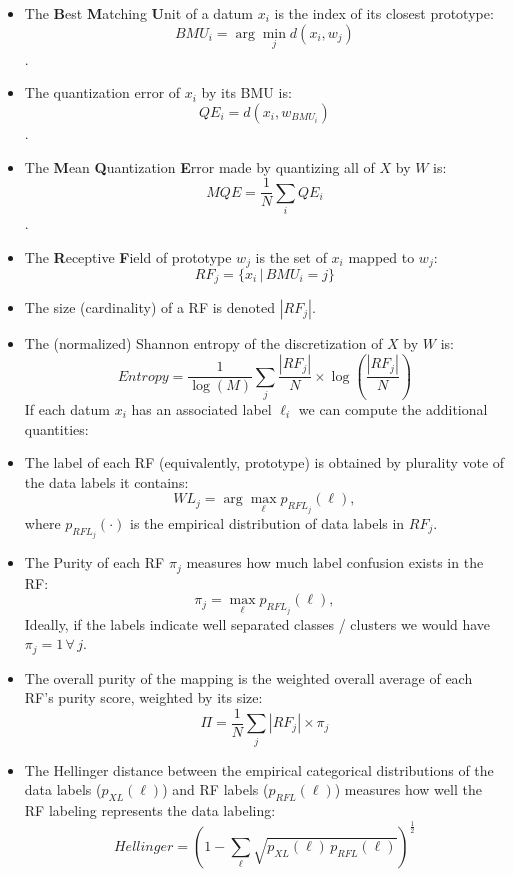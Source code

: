 \documentclass[11pt,]{article}
\providecommand{\tightlist}{%
\setlength{\itemsep}{0pt}\setlength{\parskip}{0pt}}
\begin{document}
\begin{itemize}
\tightlist
\item
  The \textbf{B}est \textbf{M}atching \textbf{U}nit of a datum \(x_i\)
  is the index of its closest prototype:
  \[BMU_i = \arg\min_j d(x_i, w_j)\].
\item
  The quantization error of \(x_i\) by its BMU is:
  \[QE_i = d(x_i, w_{BMU_i})\].
\item
  The \textbf{M}ean \textbf{Q}uantization \textbf{E}rror made by
  quantizing all of \(X\) by \(W\) is:
  \[MQE = \frac{1}{N} \sum_i QE_i\].
\item
  The \textbf{R}eceptive \textbf{F}ield of prototype \(w_j\) is the set
  of \(x_i\) mapped to \(w_j\):\\
  \[RF_j = \{x_i \, | \, BMU_i=j\}\]
\item
  The size (cardinality) of a RF is denoted \(|RF_j|\).\\
\item
  The (normalized) Shannon entropy of the discretization of \(X\) by
  \(W\) is:
  \[Entropy = \frac{1}{\log(M)} \sum_j \frac{|RF_j|}{N} \times \log\left(\frac{|RF_j|}{N}\right)\]
  If each datum \(x_i\) has an associated label \(\ell_i\) we can
  compute the additional quantities:
\item
  The label of each RF (equivalently, prototype) is obtained by
  plurality vote of the data labels it contains:
  \[WL_j = \arg\max_{\ell} p_{RFL_j}(\ell),\] where \(p_{RFL_j}(\cdot)\)
  is the empirical distribution of data labels in \(RF_j\).\\
\item
  The Purity of each RF \(\pi_j\) measures how much label confusion
  exists in the RF: \[\pi_j = \max_{\ell} p_{RFL_j}(\ell),\] Ideally, if
  the labels indicate well separated classes / clusters we would have
  \(\pi_j = 1 \, \forall \, j\).\\
\item
  The overall purity of the mapping is the weighted overall average of
  each RF's purity score, weighted by its size:
  \[\Pi = \frac{1}{N} \sum_j |RF_j| \times \pi_j\]
\item
  The Hellinger distance between the empirical categorical distributions
  of the data labels (\(p_{XL}(\ell)\)) and RF labels
  (\(p_{RFL}(\ell)\)) measures how well the RF labeling represents the
  data labeling:
  \[ Hellinger = \left( 1 - \sum_{\ell}  \sqrt{ p_{XL}(\ell) \, p_{RFL}(\ell)} \right)^{\frac{1}{2}}\]
\end{itemize}
\end{document}
